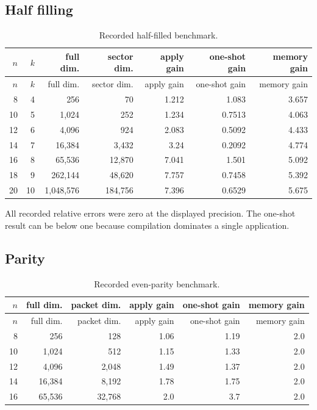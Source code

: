 \subsection{Half filling}
\begin{longtable}{@{}rrrrrrr@{}}
\caption{Recorded half-filled benchmark.}\\
\toprule
$n$ & $k$ & full dim. & sector dim. & apply gain & one-shot gain & memory gain\\
\midrule
\endfirsthead
\toprule
$n$ & $k$ & full dim. & sector dim. & apply gain & one-shot gain & memory gain\\
\midrule
\endhead
8 & 4 & 256 & 70 & 1.212 & 1.083 & 3.657\\
10 & 5 & 1,024 & 252 & 1.234 & 0.7513 & 4.063\\
12 & 6 & 4,096 & 924 & 2.083 & 0.5092 & 4.433\\
14 & 7 & 16,384 & 3,432 & 3.24 & 0.2092 & 4.774\\
16 & 8 & 65,536 & 12,870 & 7.041 & 1.501 & 5.092\\
18 & 9 & 262,144 & 48,620 & 7.757 & 0.7458 & 5.392\\
20 & 10 & 1,048,576 & 184,756 & 7.396 & 0.6529 & 5.675\\
\bottomrule
\end{longtable}

All recorded relative errors were zero at the displayed precision. The one-shot result can be below one because compilation dominates a single application.

\subsection{Parity}
\begin{longtable}{@{}rrrrrr@{}}
\caption{Recorded even-parity benchmark.}\\
\toprule
$n$ & full dim. & packet dim. & apply gain & one-shot gain & memory gain\\
\midrule
\endfirsthead
\toprule
$n$ & full dim. & packet dim. & apply gain & one-shot gain & memory gain\\
\midrule
\endhead
8 & 256 & 128 & 1.06 & 1.19 & 2.0\\
10 & 1,024 & 512 & 1.15 & 1.33 & 2.0\\
12 & 4,096 & 2,048 & 1.49 & 1.37 & 2.0\\
14 & 16,384 & 8,192 & 1.78 & 1.75 & 2.0\\
16 & 65,536 & 32,768 & 2.0 & 3.7 & 2.0\\
\bottomrule
\end{longtable}

